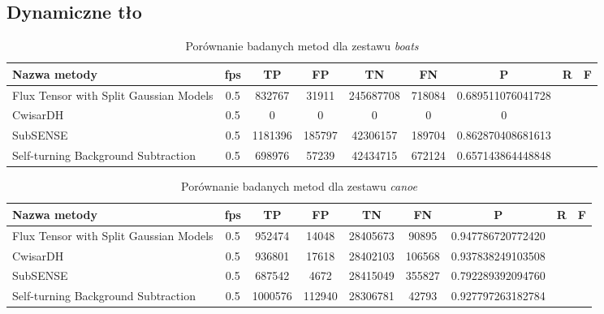 \subsection{Dynamiczne tło}
\begin{table}[!htb]
\caption{Porównanie badanych metod dla zestawu \textit{boats}}
\label{tab:resultsBoats}
\centering
\begin{tabular}{|l*{8}{|c}|}
  \hline 
  \textbf{Nazwa metody} & \textbf{fps} & \textbf{TP} & \textbf{FP} & \textbf{TN} & \textbf{FN} & \textbf{P} & \textbf{R} & \textbf{F}\\
  \hline
  Flux Tensor with Split Gaussian Models & 0.5 & 832767 & 31911 & 245687708 & 718084 & 0.689511076041728\\
  \hline
  CwisarDH & 0.5 & 0 & 0 & 0 & 0 & 0 \\
  \hline
  SubSENSE & 0.5 & 1181396 & 185797 & 42306157 & 189704 & 0.862870408681613\\
  \hline
  Self-turning Background Subtraction & 0.5 & 698976 & 57239 & 42434715 & 672124 & 0.657143864448848\\
  \hline
\end{tabular}
\end{table}

\begin{table}[h]
\caption{Porównanie badanych metod dla zestawu \textit{canoe}}
\label{tab:resultsCanoe}
\centering
\begin{tabular}{|l*{8}{|c}|}
  \hline 
  \textbf{Nazwa metody} & \textbf{fps} & \textbf{TP} & \textbf{FP} & \textbf{TN} & \textbf{FN} & \textbf{P} & \textbf{R} & \textbf{F}\\
  \hline
  Flux Tensor with Split Gaussian Models & 0.5 & 952474 & 14048 & 28405673 & 90895 & 0.947786720772420 \\
  \hline
  CwisarDH & 0.5 & 936801 & 17618 & 28402103 & 106568 & 0.937838249103508\\
  \hline
  SubSENSE & 0.5 & 687542 & 4672 & 28415049 & 355827 & 0.792289392094760 \\
  \hline
  Self-turning Background Subtraction & 0.5 & 1000576 & 112940 & 28306781 & 42793 & 0.927797263182784\\
  \hline
\end{tabular}
\end{table}

